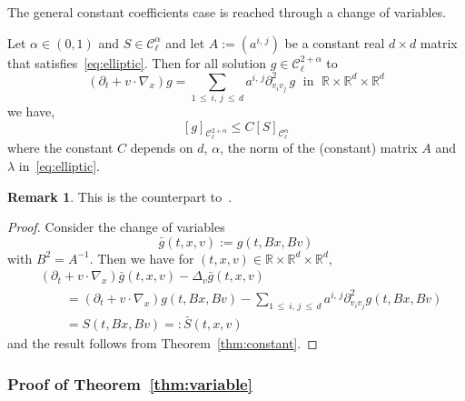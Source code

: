 \documentclass[10pt]{amsart}
\theoremstyle{definition}\newtheorem{defi}[theo]{Definition}\newtheorem{rema}[theo]{Remark}\newtheorem{exam}[theo]{Example}\newtheorem{exem}[theo]{Example}\newtheorem{nota}[theo]{Notation}
\newcommand{\R}{\mathbb{R}}
\newcommand{\cC}{\mathcal{C}}
\begin{document}
The general constant coefficients case is reached through a change of variables.
\begin{coro}\label{cor:constant}
Let $\alpha \in (0,1)$ and $S \in \cC_\ell^\alpha$ and let $A:=(a^{i,\,j})$ be a constant real $d \times d$ matrix that satisfies~\eqref{eq:elliptic}. Then for all solution $g \in \cC_\ell^{2+\alpha}$ to
\[
(\partial_t + v \cdot \nabla_x) g = \sum_{1\,\le\:i,\,j\:\le\, d} a^{i,\,j} \partial^2_{v_i v_j}\,g \; \text{ in }\;  \R \times \R^d
\times \R^d
\]
we have,
\[
[g]_{\cC_\ell^{2+\alpha}} \le C [S]_{\cC_\ell^{\alpha}}
\]
where the constant $C$ depends on $d$, $\alpha$, the norm of the (constant) matrix $A$ and $\lambda$ in~\eqref{eq:elliptic}.
\end{coro}
\goodbreak

\begin{rema}
This is the counterpart to~\cite[Theorem~8.9.1, p.~127]{krylov1996}.
\end{rema}


\begin{proof}
Consider the change of variables
\[
\bar g(t,x,v) := g(t,B x,B v)
\]
with $B^2=A^{-1}$. Then we have for $(t,x,v) \in \R \times \R^d \times \R^d$,
\begin{align*}
& (\partial_t + v \cdot \nabla_x) \bar g (t,x,v) - \Delta_v \bar g(t,x,v) \\
&\qquad = (\partial_t + v \cdot \nabla_x) g (t,B x,B v) - \sum_{1\,\le\:i,\,j\:\le\,d} a^{i,\,j} \partial^2_{v_i v_j} g(t,B x, B v) \\
&\qquad = S(t,Bx,Bv) =: \bar S (t,x,v)
\end{align*}
and the result follows from Theorem~\ref{thm:constant}.
\end{proof}


\subsubsection{Proof of Theorem~\ref{thm:variable}}
\end{document}
